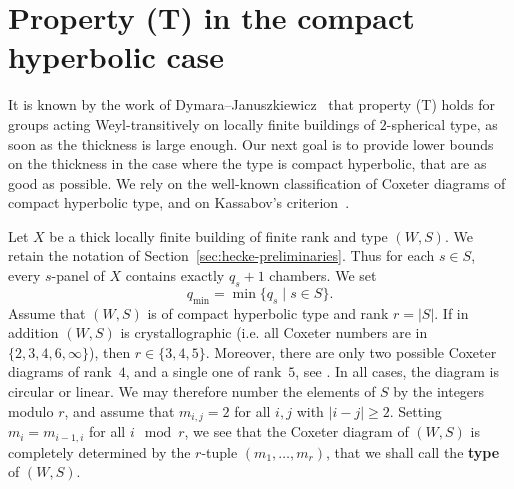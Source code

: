 \documentclass[12pt,a4paper]{amsproc}
\theoremstyle{definition}
\newcommand{\qmin}{q_{\mathrm{min}}}
\begin{document}
\section{Property (T) in the compact hyperbolic case}
\label{sec:Kazhdan}

It is known by the work of Dymara--Januszkiewicz~\cite{DymJan} that property (T) holds for groups acting Weyl-transitively on locally finite buildings of $2$-spherical type, as soon as the thickness is large enough. Our next goal is to provide lower bounds on the thickness in the case where the type is compact hyperbolic, that are as good as possible. We rely on the well-known classification of Coxeter diagrams of compact hyperbolic type, and on Kassabov's criterion~\cite{Ka11}.

Let $X$ be a thick locally finite building of finite rank and type $(W,S)$. We retain the notation of Section~\ref{sec:hecke-preliminaries}. Thus for each $s \in S$, every $s$-panel of $X$ contains exactly $q_s +1$ chambers. We set 
$$\qmin = \min\{q_s \mid s \in S\}.$$
Assume that $(W, S)$ is of compact hyperbolic type and rank $r = |S|$. If in addition $(W, S)$ is crystallographic (i.e. all Coxeter numbers are in $\{2, 3, 4, 6, \infty\}$), then $r \in\{3, 4, 5\}$. Moreover, there are only two possible Coxeter diagrams of rank~$4$, and a single one of rank~$5$, see \cite[Ch.~V, \S4, Ex.~15]{Bour}. In all cases, the diagram is circular or linear. We may therefore number the elements of $S$ by the integers modulo $r$, and assume that $m_{i, j} = 2$ for all $i, j$ with $|i-j| \geq 2$. Setting $m_i = m_{i-1, i}$ for all $i \mod r$, we see that the Coxeter diagram of $(W, S)$ is completely determined by the $r$-tuple $(m_1, \dots, m_r)$, that we shall call the \textbf{type} of $(W, S)$.
\end{document}
